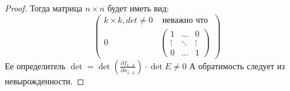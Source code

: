 \begin{theorem}
\begin{proof}
        Тогда матрица $n \times n$ будет иметь вид:
        \[\left(\begin{array}{c|c}
            k \times k, det \neq 0 & \text{ неважно что} \\
            \hline
            0 & \begin{pmatrix}
                1 & \hdots & 0 \\
                \vdots & \ddots & \vdots \\ 
                0 & \hdots & 1
            \end{pmatrix}
        \end{array}\right)\]
        Ее определитель $\det = \det(\frac{\partial f_{1 \hdots k}}{\partial x_{1 \hdots k}})\cdot \det E \neq 0$
        А обратимость следует из невырожденности.
    \end{proof}
\end{theorem}

